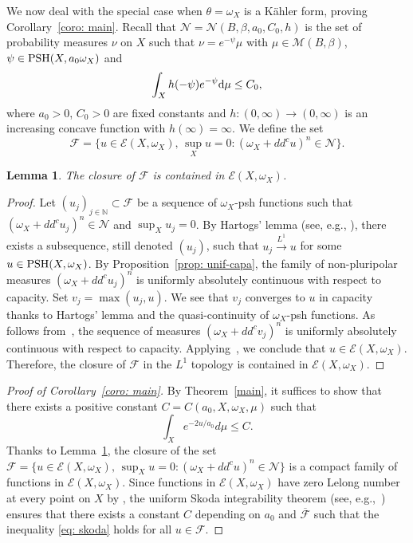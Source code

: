 \documentclass[a4paper,11pt]{amsart}
\numberwithin{equation}{section}
\newtheorem{lemma}[theorem]{Lemma}
\theoremstyle{definition}
\newcommand{\ddc}{dd^c}
\newcommand{\PSH}{{\rm PSH}}
\begin{document}
We now deal with the special case when $\theta =\omega_X$ is a K\"ahler form, proving Corollary~\ref{coro: main}. 
Recall that $\mathcal{N}=\mathcal{N}(B,\beta,a_0,C_0,h)$ is the set of probability measures $\nu$ on $X$ such that $\nu=e^{-\psi}\mu$ with $\mu\in\mathcal{M}(B,\beta)$, $\psi\in\PSH(X, a_0\omega_X)$ and  
$$\int_Xh(-\psi)e^{-\psi}{\rm d}\mu\leq C_0,$$ 
where $a_0>0$, $ C_0>0$ are fixed constants and $h: (0, \infty)\rightarrow (0, \infty)$ is an increasing concave function with $h(\infty)=\infty$. We define the set $$\mathcal{F}=\{u\in\mathcal{E}(X,\omega_X),\,\sup_X u=0\colon (\omega_X+\ddc u)^n\in\mathcal{N}\}.$$
\begin{lemma}\label{lem: compact}
   The closure of $\mathcal{F}$ is contained in $\mathcal{E}(X,\omega_X)$. 
\end{lemma}
\begin{proof} Let $(u_j)_{j\in\mathbb N}\subset \mathcal{F}$ be a sequence of $\omega_X$-psh functions such that $(\omega_X+\ddc u_j)^n\in\mathcal{N}$ and $\sup_X u_j=0$. By Hartogs' lemma (see, e.g., \cite[Proposition 8.4]{guedj2017degenerate}), there exists a subsequence, still denoted $(u_j)$, such that
$u_j\xrightarrow{L^1} u$ for some $u\in\PSH(X, \omega_X)$. 
    By Proposition~\ref{prop: unif-capa}, the family of non-pluripolar measures $(\omega_X+\ddc u_j)^n$ is uniformly absolutely continuous with respect to capacity. Set $v_j=\max(u_j,u)$. We see that $v_j$ converges to $u$ in capacity thanks to Hartogs' lemma and the quasi-continuity of $\omega_X$-psh functions.
    As follows from~\cite[Propositions 2.10]{dinew12-cv-capacity}, the sequence of measures $(\omega_X+\ddc v_j)^n$ is uniformly absolutely continuous with respect to capacity. Applying~\cite[Proposition 2.11]{dinew12-cv-capacity}, we conclude that $u\in\mathcal{E}(X,\omega_X)$.
    Therefore, the closure of $\mathcal{F}$ in the $L^1$ topology is contained in $\mathcal{E}(X,\omega_X)$.
\end{proof}
\begin{proof}[Proof of Corollary~\ref{coro: main}] 
    By Theorem~\ref{main}, it suffices to show that there exists a positive constant $C=C(a_0,X,\omega_X,\mu)$ such that
    \begin{equation}\label{eq: skoda}
        \int_X e^{-2u/a_0}d\mu\leq C.
    \end{equation}
    Thanks to Lemma~\ref{lem: compact}, the closure of the set $\mathcal{F}= \{u\in\mathcal{E}(X,\omega_X),\,\sup_X u=0\colon (\omega_X+\ddc u)^n\in\mathcal{N}\}$ is a compact family of functions in $\mathcal{E}(X,\omega_X)$. Since functions in $\mathcal{E}(X,\omega_X)$ have zero Lelong number at every point on $X$ by \cite{guedj2007weighted}, the uniform Skoda integrability
theorem (see, e.g.,~\cite{guedj2017degenerate}) ensures that there exists a constant $C$ depending on $a_0$ and $\overline{\mathcal{F}}$ such that the inequality \eqref{eq: skoda} holds for all $u\in\mathcal{F}$. 
\end{proof}
\end{document}
